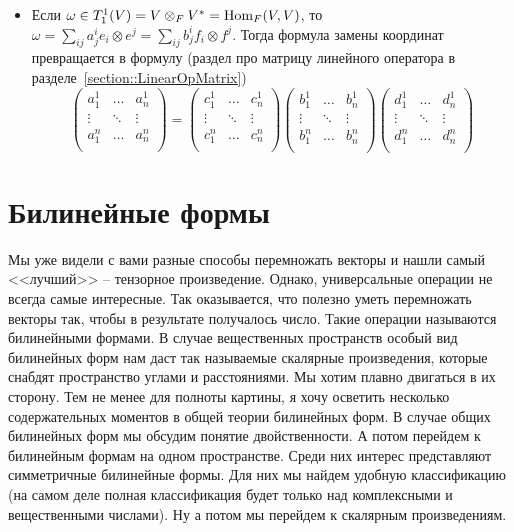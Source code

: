 \begin{itemize}
\item Если $\omega\in T^1_1(V) = V\otimes_F V^* = \operatorname{Hom}_F(V, V)$, то $\omega = \sum_{ij}a^i_j e_i \otimes e^j = \sum_{ij} b^i_j f_i\otimes f^j$.
Тогда формула замены координат превращается в формулу (раздел про матрицу линейного оператора в разделе~\ref{section::LinearOpMatrix})
\[
\begin{pmatrix}
{a^1_1}&{\ldots}&{a^1_n}\\
{\vdots}&{\ddots}&{\vdots}\\
{a^n_1}&{\ldots}&{a^n_n}\\
\end{pmatrix}
=
\begin{pmatrix}
{c^1_1}&{\ldots}&{c^1_n}\\
{\vdots}&{\ddots}&{\vdots}\\
{c^n_1}&{\ldots}&{c^n_n}\\
\end{pmatrix}
\begin{pmatrix}
{b^1_1}&{\ldots}&{b^1_n}\\
{\vdots}&{\ddots}&{\vdots}\\
{b^n_1}&{\ldots}&{b^n_n}\\
\end{pmatrix}
\begin{pmatrix}
{d^1_1}&{\ldots}&{d^1_n}\\
{\vdots}&{\ddots}&{\vdots}\\
{d^n_1}&{\ldots}&{d^n_n}\\
\end{pmatrix}
\]
\end{itemize}


\newpage
\section{Билинейные формы}

Мы уже видели с вами разные способы перемножать векторы и нашли самый <<лучший>> -- тензорное произведение.
Однако, универсальные операции не всегда самые интересные.
Так оказывается, что полезно уметь перемножать векторы так, чтобы в результате получалось число.
Такие операции называются билинейными формами.
В случае вещественных пространств особый вид билинейных форм нам даст так называемые скалярные произведения, которые снабдят пространство углами и расстояниями.
Мы хотим плавно двигаться в их сторону.
Тем не менее для полноты картины, я хочу осветить несколько содержательных моментов в общей теории билинейных форм.
В случае общих билинейных форм мы обсудим понятие двойственности.
А потом перейдем к билинейным формам на одном пространстве.
Среди них интерес представляют симметричные билинейные формы.
Для них мы найдем удобную классификацию (на самом деле полная классификация будет только над комплексными и вещественными числами).
Ну а потом мы перейдем к скалярным произведениям.

